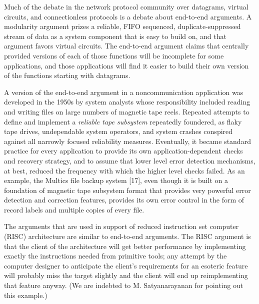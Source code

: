 \documentclass[a4paper,11pt,notitlepage,twoside,openright]{article}
\begin{document}
Much of the debate in the network protocol community over datagrams,
virtual circuits, and connectionless protocols is a debate about
end-to-end arguments. A modularity argument prizes a reliable, FIFO
sequenced, duplicate-suppressed stream of data as a system component
that is easy to build on, and that argument favors virtual circuits. The
end-to-end argument claims that centrally provided versions of each of
those functions will be incomplete for some applications, and those
applications will find it easier to build their own version of the
functions starting with datagrams.

A version of the end-to-end argument in a noncommunication application
was developed in the 1950s by system analysts whose responsibility
included reading and writing files on large numbers of magnetic tape
reels. Repeated attempts to define and implement a \emph{reliable tape
subsystem} repeatedly foundered, as flaky tape drives, undependable
system operators, and system crashes conspired against all narrowly
focused reliability measures. Eventually, it became standard practice
for every application to provide its own application-dependent checks
and recovery strategy, and to assume that lower level error detection
mechanisms, at best, reduced the frequency with which the higher level
checks failed. As an example, the Multics file backup system {[}17{]},
even though it is built on a foundation of magnetic tape subsystem
format that provides very powerful error detection and correction
features, provides its own error control in the form of record labels
and multiple copies of every file.


The arguments that are used in support of reduced instruction set
computer (RISC) architecture are similar to end-to-end arguments. The
RISC argument is that the client of the architecture will get better
performance by implementing exactly the instructions needed from
primitive tools; any attempt by the computer designer to anticipate the
client's requirements for an esoteric feature will probably miss the
target slightly and the client will end up reimplementing that feature
anyway. (We are indebted to M. Satyanarayanan for pointing out this
example.)
\end{document}
